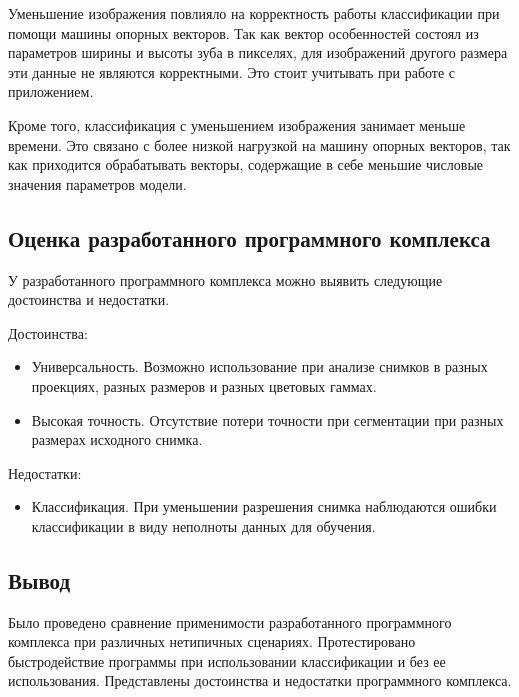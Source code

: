Уменьшение изображения повлияло на корректность работы классификации при помощи машины опорных векторов. Так как вектор особенностей состоял из параметров ширины и высоты зуба в пикселях, для изображений другого размера эти данные не являются корректными. Это стоит учитывать при работе с приложением.

Кроме того, классификация с уменьшением изображения занимает меньше времени. Это связано с более низкой нагрузкой на машину опорных векторов, так как приходится обрабатывать векторы, содержащие в себе меньшие числовые значения параметров модели.

\subsection{Оценка разработанного программного комплекса}

У разработанного программного комплекса можно выявить следующие достоинства и недостатки.

Достоинства:
\begin{itemize}
	\item Универсальность. Возможно использование при анализе снимков в разных проекциях, разных размеров и разных цветовых гаммах.
	\item Высокая точность. Отсутствие потери точности при сегментации при разных размерах исходного снимка.
\end{itemize}

Недостатки:
\begin{itemize}
	\item Классификация. При уменьшении разрешения снимка наблюдаются ошибки классификации в виду неполноты данных для обучения.
\end{itemize}

\subsection*{Вывод}

Было проведено сравнение применимости разработанного программного комплекса при различных нетипичных сценариях. Протестировано быстродействие программы при использовании классификации и без ее использования. Представлены достоинства и недостатки программного комплекса.